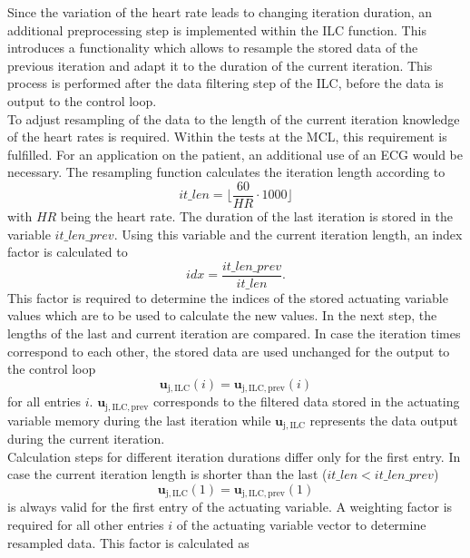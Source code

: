 Since the variation of the heart rate leads to changing iteration duration, an additional preprocessing step is implemented within the ILC function. This introduces a functionality which allows to resample the stored data of the previous iteration and adapt it to the duration of the current iteration. This process is performed after the data filtering step of the ILC, before the data is output to the control loop.
\\To adjust resampling of the data to the length of the current iteration knowledge of the heart rates is required. Within the tests at the MCL, this requirement is fulfilled. For an application on the patient, an additional use of an ECG would be necessary.
The resampling function calculates the iteration length according to
\begin{equation}
  it\_len = \lfloor\frac{60}{HR}\cdot1000\rfloor
\end{equation}
with $HR$ being the heart rate. The duration of the last iteration is stored in the variable $it\_len\_prev$. Using this variable and the current iteration length, an index factor is calculated to
\begin{equation}
  idx = \frac{it\_len\_prev}{it\_len}.
\end{equation}
This factor is required to determine the indices of the stored actuating variable values which are to be used to calculate the new values.
In the next step, the lengths of the last and current iteration are compared. In case the iteration times correspond to each other, the stored data are used unchanged for the output to the control loop
\begin{equation}
  \mathbf{u}_{\mathrm{j,ILC}}(i) = \mathbf{u}_{\mathrm{j,ILC,prev}}(i)
\end{equation} for all entries $i$. $\mathbf{u}_{\mathrm{j,ILC,prev}}$ corresponds to the filtered data stored in the actuating variable memory during the last iteration while $\mathbf{u}_{\mathrm{j,ILC}}$ represents the data output during the current iteration.
\\Calculation steps for different iteration durations differ only for the first entry. In case the current iteration length is shorter than the last ($it\_len<it\_len\_prev$)
\begin{equation}
  \mathbf{u}_{\mathrm{j,ILC}}(1) = \mathbf{u}_{\mathrm{j,ILC,prev}}(1)
\end{equation} is always valid for the first entry of the actuating variable.
A weighting factor is required for all other entries $i$ of the actuating variable vector to determine resampled data. This factor is calculated as
